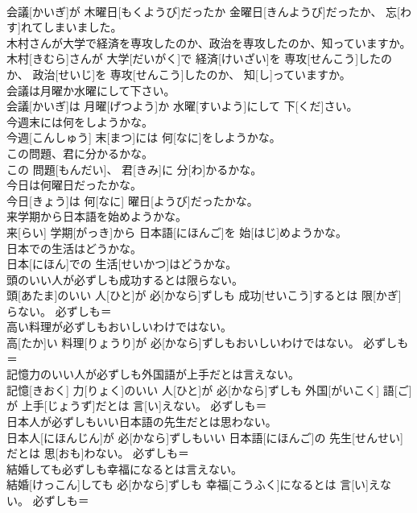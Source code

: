 \documentclass[8pt]{extreport}
\begin{document}
\begin{CJK}{UTF8}{min}
\\	会議[かいぎ]が 木曜日[もくようび]だったか 金曜日[きんようび]だったか、 忘[わす]れてしまいました。	
\\	木村さんが大学で経済を専攻したのか、政治を専攻したのか、知っていますか。	
\\	木村[きむら]さんが 大学[だいがく]で 経済[けいざい]を 専攻[せんこう]したのか、 政治[せいじ]を 専攻[せんこう]したのか、 知[し]っていますか。	
\\	会議は月曜か水曜にして下さい。	
\\	会議[かいぎ]は 月曜[げつよう]か 水曜[すいよう]にして 下[くだ]さい。	
\\	今週末には何をしようかな。	
\\	今週[こんしゅう] 末[まつ]には 何[なに]をしようかな。	
\\	この問題、君に分かるかな。	
\\	この 問題[もんだい]、 君[きみ]に 分[わ]かるかな。	
\\	今日は何曜日だったかな。	
\\	今日[きょう]は 何[なに] 曜日[ようび]だったかな。	
\\	来学期から日本語を始めようかな。	
\\	来[らい] 学期[がっき]から 日本語[にほんご]を 始[はじ]めようかな。	
\\	日本での生活はどうかな。	
\\	日本[にほん]での 生活[せいかつ]はどうかな。	
\\	頭のいい人が必ずしも成功するとは限らない。	
\\	頭[あたま]のいい 人[ひと]が 必[かなら]ずしも 成功[せいこう]するとは 限[かぎ]らない。	必ずしも＝ 
\\	高い料理が必ずしもおいしいわけではない。	
\\	高[たか]い 料理[りょうり]が 必[かなら]ずしもおいしいわけではない。	必ずしも＝ 
\\	記憶力のいい人が必ずしも外国語が上手だとは言えない。	
\\	記憶[きおく] 力[りょく]のいい 人[ひと]が 必[かなら]ずしも 外国[がいこく] 語[ご]が 上手[じょうず]だとは 言[い]えない。	必ずしも＝ 
\\	日本人が必ずしもいい日本語の先生だとは思わない。	
\\	日本人[にほんじん]が 必[かなら]ずしもいい 日本語[にほんご]の 先生[せんせい]だとは 思[おも]わない。	必ずしも＝ 
\\	結婚しても必ずしも幸福になるとは言えない。	
\\	結婚[けっこん]しても 必[かなら]ずしも 幸福[こうふく]になるとは 言[い]えない。	必ずしも＝ 

\end{CJK}
\end{document}
